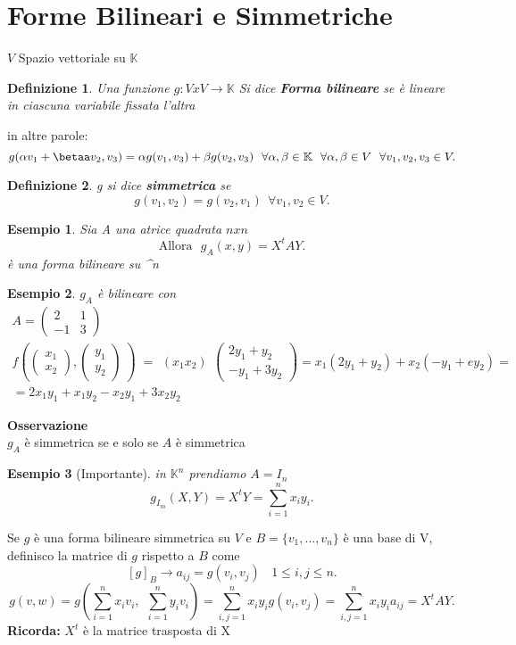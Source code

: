 \documentclass[12px]{article}
\theoremstyle{break}
\theoremstyle{break}
\theoremstyle{break}
\newtheorem{defin}{Definizione}
\theoremstyle{break}
\theoremstyle{break}
\theoremstyle{break}
\newtheorem*{es}{Esempio}
\theoremstyle{breal}
\newenvironment{defi}
{\begin{mdframed}[linecolor=orange, backgroundcolor=orange!10]\begin{defin}}
  {\end{defin}\end{mdframed}}
\newcommand{\icol}[1]{%
  \left(\begin{smallmatrix}#1\end{smallmatrix}\right)%
}
\newcommand{\irow}[1]{%
  \begin{smallmatrix}(#1)\end{smallmatrix}%
}
\begin{document}
\section{Forme Bilineari e Simmetriche}
$V$ Spazio vettoriale su $  \mathbb{K}$
\begin{defi}
	Una funzione $g:VxV \rightarrow \mathbb{K}$ Si dice \textbf{Forma bilineare} se è lineare in ciascuna variabile fissata l'altra
\end{defi}
in altre parole:\\
\[
	g(\alpha v_1 + \betaa v_2,v_3) = \alpha g(v_1,v_3) + \beta g(v_2, v_3) \ \ \forall \alpha,\beta\in\mathbb{K}\ \ \forall \alpha,\beta\in V\ \ \forall v_1,v_2,v_3\in V
.\]
\begin{defi}
	g si dice \textbf{simmetrica} se 
	\[
	g(v_1,v_2) = g(v_2,v_1)\ \ \forall v_1,v_2\in V
	.\] 
\end{defi}
\begin{es}
	Sia A una atrice quadrata $nxn$
	\[
		\text{Allora} \ \ \ g_A(x,y) = X^tAY
	.\] 
	è una forma bilineare su ^n
\end{es}
\begin{es}
	$g_A$ è bilineare con 
	\begin{gather*}
		A = \icol{2& 1 \\ -1 & 3} \\
		f\left(\icol{x_1\\x_2},\icol{y_1\\y_2}\left) = \irow{x_1 x_2}\icol{2y_1 + y_2\\-y_1 + 3y_2} = x_1(2y_1 + y_2) + x_2(-y_1 + ey_2)= \\ = 2x_1y_1 + x_1y_2 - x_2y_1 + 3x_2y_2
	\end{gather*}
\end{es}
\textbf{Osservazione} \\
$g_A$ è simmetrica se e solo se $A$ è simmetrica \\
\begin{es}[Importante]
	in $\mathbb{K}^n$ prendiamo $A = I_n$
	\[
		g_{I_m}(X,Y) = X^tY = \sum^n_{i=1}x_iy_i
	.\] 
\end{es}
Se $g$ è una forma bilineare simmetrica su $V$ e $B = \{v_1,\ldots,v_n\}$ è una base di V, definisco la matrice di $g$ rispetto a $B$ come \[
	[g]_B \rightarrow a_{ij} = g(v_i,v_j) \ \ \ \ 1 \leq i,j \leq n
.\] 
\[
	g(v,w) = g(\sum^n_{i=1}x_iv_i, \ \ \sum^n_{i=1}y_iv_i) = \sum^n_{i,j=1} x_iy_ig(v_i,v_j) = \sum^n_{i,j=1} x_iy_ia_{ij} = X^tAY
.\] 
\textbf{Ricorda:}
$X^t$ è la matrice trasposta di X
\newpage
\end{document}
